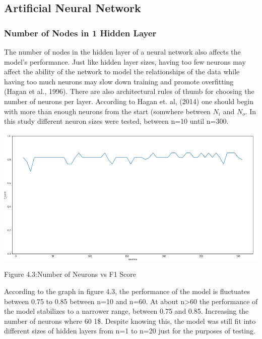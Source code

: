 \documentclass[]{report}
\begin{document}
\subsection{Artificial Neural
Network}\label{artificial-neural-network-1}

\subsubsection{Number of Nodes in 1 Hidden
Layer}\label{number-of-nodes-in-1-hidden-layer}

The number of nodes in the hidden layer of a neural network also affects
the model's performance. Just like hidden layer sizes, having too few
neurons may affect the ability of the network to model the relationships
of the data while having too much neurons may slow down training and
promote overfitting (Hagan et al., 1996). There are also architectural
rules of thumb for choosing the number of neurons per layer. According
to Hagan et. al, (2014) one should begin with more than enough neurons
from the start (somwhere between \(N_i\) and \(N_o\). In this study
different neuron sizes were tested, between n=10 until n=300.

\includegraphics{images/neuronssize.png}

\begin{center} Figure 4.3:Number of Neurons vs F1 Score \end{center}

According to the graph in figure 4.3, the performance of the model is
fluctuates between 0.75 to 0.85 between n=10 and n=60. At about
n\textgreater{}60 the performance of the model stabilizes to a narrower
range, between 0.75 and 0.85. Increasing the number of neurons where 60
1\$. Despite knowing this, the model was still fit into different sizes
of hidden layers from n=1 to n=20 just for the purposes of testing.
\end{document}
